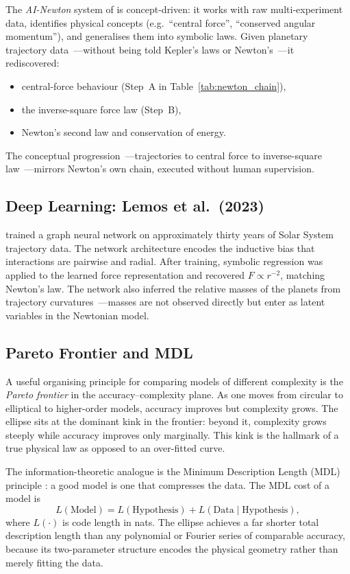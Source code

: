 \documentclass[12pt]{article}
\begin{document}
The \textit{AI-Newton} system of \citet{FangEtAl2023} is concept-driven:
it works with raw multi-experiment data, identifies physical concepts
(e.g.\ ``central force'', ``conserved angular momentum''), and generalises
them into symbolic laws.
Given planetary trajectory data~---without being told Kepler's laws or
Newton's~---it rediscovered:
\begin{itemize}
  \item central-force behaviour (Step~A in Table~\ref{tab:newton_chain}),
  \item the inverse-square force law (Step~B),
  \item Newton's second law and conservation of energy.
\end{itemize}
The conceptual progression~---trajectories to central force to
inverse-square law~---mirrors Newton's own chain, executed without
human supervision.

\subsection{Deep Learning: Lemos et al.\ (2023)}

\citet{Lemos2023} trained a graph neural network on approximately thirty
years of Solar System trajectory data.
The network architecture encodes the inductive bias that interactions are
pairwise and radial.
After training, symbolic regression was applied to the learned force
representation and recovered $F\propto r^{-2}$, matching Newton's law.
The network also inferred the relative masses of the planets from trajectory
curvatures~---masses are not observed directly but enter as latent variables
in the Newtonian model.

\subsection{Pareto Frontier and MDL}

A useful organising principle for comparing models of different complexity
is the \emph{Pareto frontier} in the accuracy--complexity plane.
As one moves from circular to elliptical to higher-order models, accuracy
improves but complexity grows.
The ellipse sits at the dominant kink in the frontier: beyond it,
complexity grows steeply while accuracy improves only marginally.
This kink is the hallmark of a true physical law as opposed to an
over-fitted curve.

The information-theoretic analogue is the Minimum Description Length (MDL)
principle \citep{SchmidtLipson2009}: a good model is one that compresses
the data.
The MDL cost of a model is
\[
  L(\text{Model}) = L(\text{Hypothesis}) + L(\text{Data}\mid\text{Hypothesis}),
\]
where $L(\cdot)$ is code length in nats.
The ellipse achieves a far shorter total description length than any
polynomial or Fourier series of comparable accuracy, because its
two-parameter structure encodes the physical geometry rather than
merely fitting the data.
\end{document}
